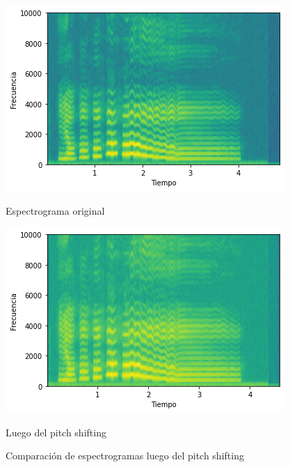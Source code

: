 \documentclass[a4paper]{article}
\begin{document}
\begin{figure}[!h]
\begin{minipage}[b]{0.5\linewidth}
\centering
\includegraphics[width=\linewidth]{original2.png}
\caption{Espectrograma original}
\label{original}
\end{minipage}
\hspace{0.5cm}
\begin{minipage}[b]{0.5\linewidth}
\centering
\includegraphics[width=\linewidth]{pitchshift.png}
\caption{Luego del pitch shifting}
\label{espect}
\end{minipage}
\caption{Comparación de espectrogramas luego del pitch shifting}
\label{ps}
\end{figure}
\end{document}
